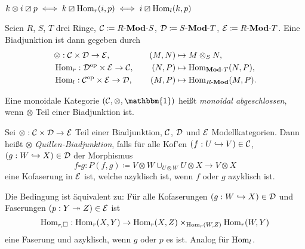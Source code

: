 \documentclass{cheat-sheet}
\newcommand{\lhhe}{\boxslash} %
\newcommand{\LonelyHeart}{\{ \, \heartsuit \, \}} %
\newcommand{\UnitOb}{\mathbbm{1}} %
\begin{document}
\begin{bem}
  $k \otimes i \lhhe p \iff k \lhhe \Hom_r(i, p) \iff i \lhhe \Hom_l(k, p)$
\end{bem}

\begin{bsp}
  Seien $R$, $S$, $T$ drei Ringe, $\mathcal{C} \coloneqq {R}\text{-}\mathbf{Mod}\text{-}{S}$, $\mathcal{D} \coloneqq {S}\text{-}\mathbf{Mod}\text{-}{T}$, $\mathcal{E} \coloneqq {R}\text{-}\mathbf{Mod}\text{-}{T}$. Eine Biadjunktion ist dann gegeben durch
  \begin{alignat*}{3}
    & \otimes : \mathcal{C} \times \mathcal{D} \to \mathcal{E}, \quad & (M, N) & \mapsto M \otimes_S N, \\
    & \operatorname{Hom}_r : \mathcal{D}^{\mathrm{op}} \times \mathcal{E} \to \mathcal{C}, \quad & (N, P) & \mapsto \operatorname{Hom}_{\mathbf{Mod}\text{-}{T}}(N, P), \\
    & \operatorname{Hom}_l : \mathcal{C}^{\mathrm{op}} \times \mathcal{E} \to \mathcal{D}, \quad & (M, P) & \mapsto \operatorname{Hom}_{{R}\text{-}\mathbf{Mod}}(M, P).
  \end{alignat*}
\end{bsp}

\begin{defn}
  Eine monoidale Kategorie $(\Cat, \otimes, \UnitOb)$ heißt \emph{monoidal abgeschlossen}, wenn $\otimes$ Teil einer Biadjunktion ist.
\end{defn}

\begin{bspe}
   \quad
  \inlineitem{$(\SetC, \times, \LonelyHeart)$}
\end{bspe}


\begin{defn}
  Sei $\otimes : \mathcal{C} \times \mathcal{D} \to \mathcal{E}$ Teil einer Biadjunktion, $\mathcal{C}$, $\mathcal{D}$ und $\mathcal{E}$ Modellkategorien.
  Dann heißt $\otimes$ \emph{Quillen-Biadjunktion}, falls für alle Kof'en $(f : U \hookrightarrow V) \in \mathcal{C}$, $(g : W \hookrightarrow X) \in \mathcal{D}$ der Morphismus
  \[ f \square g : P(f, g) \coloneqq V \otimes W \cup_{U \otimes W} U \otimes X \to V \otimes X \]
  eine Kofaserung in $\mathcal{E}$ ist, welche azyklisch ist, wenn $f$ oder $g$ azyklisch ist.
\end{defn}

\begin{lem}
  Die Bedingung ist äquivalent zu:
  Für alle Kofaserungen $(g : W \hookrightarrow X) \in \mathcal{D}$ und Faserungen $(p : Y \twoheadrightarrow Z) \in \mathcal{E}$ ist
  \[ \operatorname{Hom}_{r,\square} : \operatorname{Hom}_r(X, Y) \to \operatorname{Hom}_r(X, Z) \times_{\operatorname{Hom}_r(W, Z)} \operatorname{Hom}_r(W, Y) \]
  eine Faserung und azyklisch, wenn $g$ oder $p$ es ist.
  Analog für $\operatorname{Hom}_l$.
\end{lem}
\end{document}
